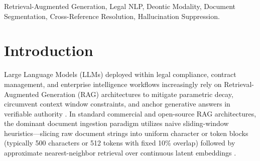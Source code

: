 \documentclass[conference]{IEEEtran}
\begin{document}
\begin{IEEEkeywords}
Retrieval-Augmented Generation, Legal NLP, Deontic Modality, Document Segmentation, Cross-Reference Resolution, Hallucination Suppression.
\end{IEEEkeywords}

\section{Introduction}
Large Language Models (LLMs) deployed within legal compliance, contract management, and enterprise intelligence workflows increasingly rely on Retrieval-Augmented Generation (RAG) architectures to mitigate parametric decay, circumvent context window constraints, and anchor generative answers in verifiable authority \cite{lewis2020retrieval, guha2024legalbench}. In standard commercial and open-source RAG architectures, the dominant document ingestion paradigm utilizes naive sliding-window heuristics---slicing raw document strings into uniform character or token blocks (typically 500 characters or 512 tokens with fixed 10\% overlap) followed by approximate nearest-neighbor retrieval over continuous latent embeddings \cite{gao2023retrieval}.
\end{document}
